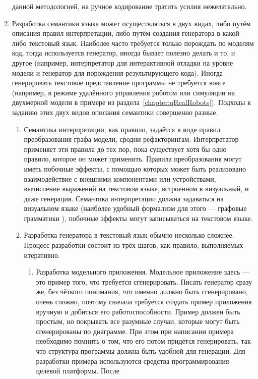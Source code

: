 \begin{enumerate}
		данной методологией, на ручное кодирование тратить усилия нежелательно.
	\item Разработка семантики языка может осуществляться в двух видах, либо путём описания 
		правил интерпретации, либо путём создания генератора в какой-либо текстовый язык. 
		Наиболее часто требуется только порождать по моделям код, тогда используется 
		генератор, иногда бывает полезно делать и то, и другое (например, интерпретатор 
		для интерактивной отладки на уровне модели и генератор для порождения результирующего 
		кода). Иногда генерировать текстовое представление программы не требуется вовсе 
		(например, в режиме удалённого управления роботом или симуляции на двухмерной 
		модели в примере из раздела~\ref{chapter:qRealRobots}). Подходы к заданию этих 
		двух видов описания семантики совершенно разные.
		\begin{enumerate}
			\item Семантика интерпретации, как правило, задаётся в виде правил преобразования 
				графа модели, сродни рефакторингам. Интерпретатор применяет эти правила до 
				тех пор, пока существует хотя бы одно правило, которое он может применить. 
				Правила преобразования могут иметь побочные эффекты, с помощью которых может 
				быть реализовано взаимодействие с внешними компонентами или устройствами, 
				вычисление выражений на текстовом языке, встроенном в визуальный, и даже генерация. 
				Семантика интерпретации должна задаваться на визуальном языке (наиболее удобный 
				формализм для этого --- графовые грамматики 
				), побочные эффекты могут записываться на текстовом языке.
			\item Разработка генератора в текстовый язык обычно несколько сложнее. Процесс 
				разработки состоит из трёх шагов, как правило, выполняемых итеративно.
				\begin{enumerate}
					\item Разработка модельного приложения. Модельное приложение здесь --- это 
						пример того, что требуется сгенерировать. Писать генератор сразу же, без 
						чёткого понимания, что именно должно быть сгенерировано, очень сложно, 
						поэтому сначала требуется создать пример приложения вручную и добиться 
						его работоспособности. Пример должен быть простым, но покрывать все разумные 
						случаи, которые могут быть сгенерированы по диаграмме. При этом при написании 
						примера необходимо помнить о том, что его потом придётся генерировать, 
						так что структура программы должна быть удобной для генерации. Для разработки 
						примера используются средства программирования целевой платформы. После 

\end{enumerate}
\end{enumerate}
\end{enumerate}
